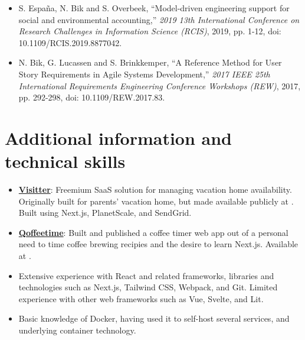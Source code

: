 \documentclass[10pt]{article}
\begin{document}
\begin{itemize}
    \item S. España, N. Bik and S. Overbeek, \enquote{Model-driven engineering support for social and environmental accounting,} \textit{2019 13th International Conference on Research Challenges in Information Science (RCIS)}, 2019, pp. 1-12, doi:\\ 10.1109/RCIS.2019.8877042.
    \item N. Bik, G. Lucassen and S. Brinkkemper, \enquote{A Reference Method for User Story Requirements in Agile Systems Development,} \textit{2017 IEEE 25th International Requirements Engineering Conference Workshops (REW)}, 2017, pp. 292-298, doi: 10.1109/REW.2017.83.
\end{itemize}

\section{Additional information and technical skills}
\label{sec:other}

\begin{itemize}
    \item \textbf{\underline{Visitter}}: Freemium SaaS solution for managing vacation home availability. Originally built for parents' vacation home, but made available publicly at . Built using Next.js, PlanetScale, and SendGrid.
    \item \textbf{\underline{Qoffeetime}}: Built and published a coffee timer web app out of a personal need to time coffee brewing recipies and the desire to learn Next.js. Available at .
    \item Extensive experience with React and related frameworks, libraries and technologies such as Next.js, Tailwind CSS, Webpack, and Git. Limited experience with other web frameworks such as Vue, Svelte, and Lit.
    \item Basic knowledge of Docker, having used it to self-host several services, and underlying container technology.
\end{itemize}
\end{document}
